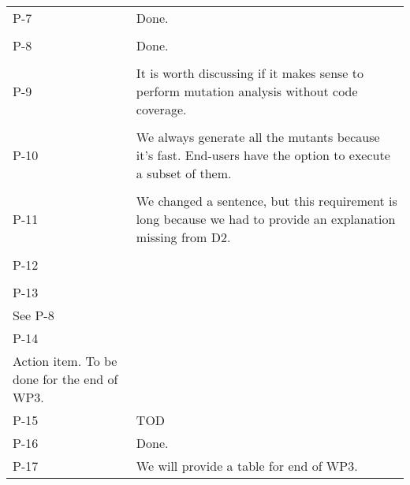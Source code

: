 \begin{longtable}{|p{1.5cm}|p{12cm}|@{}}
P-7&
\begin{minipage}{12cm}
Done.
\end{minipage}\\
\\
\hline

P-8&
\begin{minipage}{12cm}
Done.
\end{minipage}\\
\\
\hline

P-9&
\begin{minipage}{12cm}
It is worth discussing if it makes sense to perform mutation analysis without code coverage.
\end{minipage}\\
\\
\hline


P-10&
\begin{minipage}{12cm}
We always generate all the mutants because it's fast. End-users have the option to execute a subset of them.
\end{minipage}\\
\\
\hline

P-11&
\begin{minipage}{12cm}
We changed a sentence, but this requirement is long because we had to provide an explanation missing from D2.
\end{minipage}\\
\\
\hline

P-12&
\begin{minipage}{12cm}
\end{minipage}\\
\\
\hline

P-13&
\begin{minipage}{12cm}
\end{minipage}\\
See P-8\\
\hline

P-14&
\begin{minipage}{12cm}
\end{minipage}\\
Action item. To be done for the end of WP3.\\
\hline


P-15&
\begin{minipage}{12cm}
TOD
\end{minipage}\\
\hline

P-16&
\begin{minipage}{12cm}
Done.
\end{minipage}\\
\hline

P-17&
\begin{minipage}{12cm}
We will provide a table for end of WP3.
\end{minipage}\\
\hline
                                                
\end{longtable}
\normalsize

\clearpage